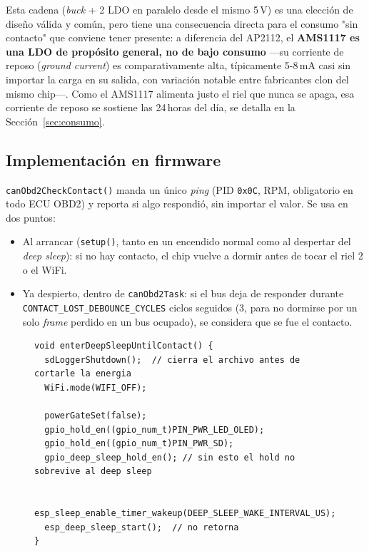 Esta cadena (\textit{buck} + 2 LDO en paralelo desde el mismo 5\,V) es una
elección de diseño válida y común, pero tiene una consecuencia directa para
el consumo "sin contacto" que conviene tener presente: a diferencia del
AP2112, el \textbf{AMS1117 es una LDO de propósito general, no de bajo
consumo} —su corriente de reposo (\textit{ground current}) es
comparativamente alta, típicamente 5-8\,mA casi sin importar la carga en
su salida, con variación notable entre fabricantes clon del mismo chip—.
Como el AMS1117 alimenta justo el riel que nunca se apaga, esa corriente de
reposo se sostiene las 24\,horas del día, se detalla en la
Sección~\ref{sec:consumo}.

\subsection{Implementación en firmware}
\texttt{canObd2CheckContact()} manda un único \textit{ping} (PID
\texttt{0x0C}, RPM, obligatorio en todo ECU OBD2) y reporta si algo
respondió, sin importar el valor. Se usa en dos puntos:

\begin{itemize}
  \item Al arrancar (\texttt{setup()}, tanto en un encendido normal como al
        despertar del \textit{deep sleep}): si no hay contacto, el chip
        vuelve a dormir antes de tocar el riel 2 o el WiFi.
  \item Ya despierto, dentro de \texttt{canObd2Task}: si el bus deja de
        responder durante \texttt{CONTACT\_LOST\_DEBOUNCE\_CYCLES} ciclos
        seguidos (3, para no dormirse por un solo \textit{frame} perdido en
        un bus ocupado), se considera que se fue el contacto.
\end{itemize}

\begin{figure}[H]
\begin{lstlisting}[caption={Entrada a deep sleep, \texttt{src/power\_sleep.cpp}.}, label={fig:deepsleep}]
void enterDeepSleepUntilContact() {
  sdLoggerShutdown();  // cierra el archivo antes de cortarle la energia
  WiFi.mode(WIFI_OFF);

  powerGateSet(false);
  gpio_hold_en((gpio_num_t)PIN_PWR_LED_OLED);
  gpio_hold_en((gpio_num_t)PIN_PWR_SD);
  gpio_deep_sleep_hold_en(); // sin esto el hold no sobrevive al deep sleep

  esp_sleep_enable_timer_wakeup(DEEP_SLEEP_WAKE_INTERVAL_US);
  esp_deep_sleep_start();  // no retorna
}
\end{lstlisting}
\end{figure}

